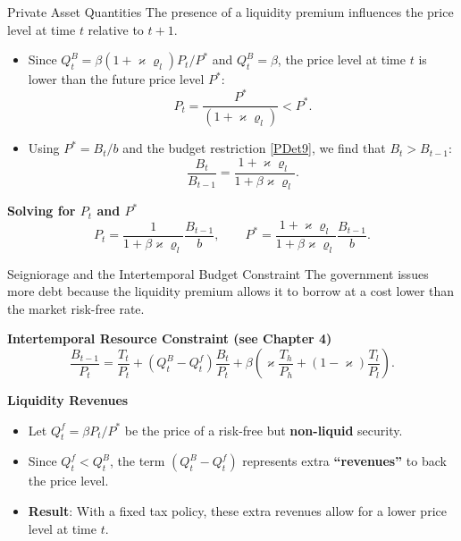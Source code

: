 \documentclass[11pt,aspectratio=169]{beamer}
\begin{document}
\begin{frame}{Private Asset Quantities}
\small
The presence of a liquidity premium influences the price level at time $t$ relative to $t+1$. 

\vspace{0.2cm}
\begin{itemize}
    \item Since $Q_{t}^{B}=\beta \left( 1+\varkappa \varrho _{l}\right) P_{t}/P^{\ast }$ and $Q_{t}^{B}=\beta$, the price level at time $t$ is lower than the future price level $P^*$:
    \begin{equation*}
    P_{t}=\frac{P^{\ast }}{\left( 1+\varkappa \varrho _{l}\right) } < P^{\ast }.
    \end{equation*}
    \item Using $P^* = B_t / b$ and the budget restriction \eqref{PDet9}, we find that $B_t > B_{t-1}$:
    \begin{equation*}
    \frac{B_{t}}{B_{t-1}}=\frac{1+\varkappa \varrho _{l}}{1+\beta \varkappa \varrho _{l}}.
    \end{equation*}
\end{itemize}

\vspace{0.2cm}
\textbf{Solving for $P_t$ and $P^*$}
\begin{equation*}
P_{t}=\frac{1}{1+\beta \varkappa \varrho _{l}}\frac{B_{t-1}}{b}, \qquad P^{\ast }=\frac{1+\varkappa \varrho _{l}}{1+\beta \varkappa \varrho _{l}}\frac{B_{t-1}}{b}.
\end{equation*}
\end{frame}

\begin{frame}{Seigniorage and the Intertemporal Budget Constraint}
\small
The government issues more debt because the liquidity premium allows it to borrow at a cost lower than the market risk-free rate.

\vspace{0.2cm}
\textbf{Intertemporal Resource Constraint (see Chapter 4)}
\begin{equation}
\frac{B_{t-1}}{P_{t}}=\frac{T_{t}}{P_{t}}+(Q_{t}^{B}-Q_{t}^{f})\frac{B_{t}}{P_{t}}+\beta \left( \varkappa \frac{T_{h}}{P_{h}}+(1-\varkappa )\frac{T_{l}}{P_{l}}\right). \label{IBCSimple}
\end{equation}

\vspace{0.2cm}
\textbf{Liquidity Revenues}
\begin{itemize}
    \item Let $Q_t^f = \beta P_t/P^*$ be the price of a risk-free but \textbf{non-liquid} security.
    \item Since $Q_t^f < Q_t^B$, the term $(Q_t^B - Q_t^f)$ represents extra \textbf{``revenues''} to back the price level.
    \item \textbf{Result}: With a fixed tax policy, these extra revenues allow for a lower price level at time $t$.
\end{itemize}
\end{frame}
\end{document}
